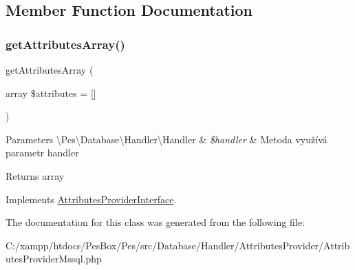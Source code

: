 \subsection{Member Function Documentation}
\mbox{\label{class_pes_1_1_database_1_1_handler_1_1_attributes_provider_1_1_attributes_provider_mssql_a78e4a9edf711d48cd3ec22eaadf560ea}} 
\subsubsection{\texorpdfstring{get\+Attributes\+Array()}{getAttributesArray()}}
{\footnotesize\ttfamily get\+Attributes\+Array (\begin{DoxyParamCaption}\item[{array}]{\$attributes = {\ttfamily \mbox{[}\mbox{]}} }\end{DoxyParamCaption})}


\begin{DoxyParams}[1]{Parameters}
\textbackslash{}\+Pes\textbackslash{}\+Database\textbackslash{}\+Handler\textbackslash{}\+Handler & {\em \$handler} & Metoda využívá parametr handler \\
\hline
\end{DoxyParams}
\begin{DoxyReturn}{Returns}
array 
\end{DoxyReturn}


Implements \mbox{\hyperlink{interface_pes_1_1_database_1_1_handler_1_1_attributes_provider_1_1_attributes_provider_interface}{Attributes\+Provider\+Interface}}.



The documentation for this class was generated from the following file\+:\begin{DoxyCompactItemize}
\item 
C\+:/xampp/htdocs/\+Pes\+Box/\+Pes/src/\+Database/\+Handler/\+Attributes\+Provider/Attributes\+Provider\+Mssql.\+php\end{DoxyCompactItemize}
